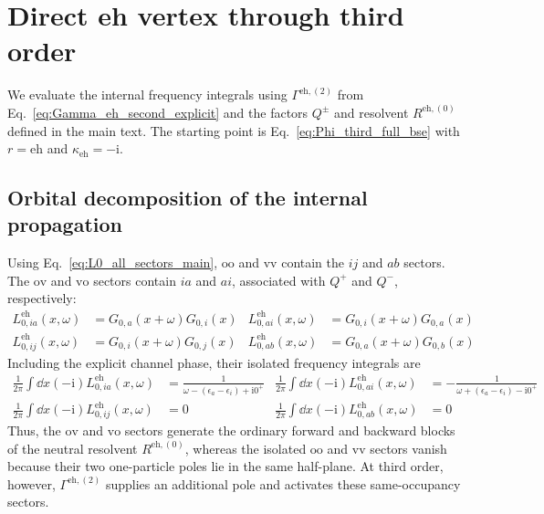 \documentclass[aip,jcp,reprint,noshowkeys,superscriptaddress]{revtex4-1}
\newcommand{\eps}{\epsilon}
\newcommand{\ii}{\mathrm{i}}
\newcommand{\eh}{\text{eh}}
\begin{document}
\onecolumngrid
\appendix

\section{Direct eh vertex through third order}
\label{sec:eh_third}

We evaluate the internal frequency integrals using
$\Gamma^{\eh,(2)}$ from Eq.~\eqref{eq:Gamma_eh_second_explicit} and
the factors $Q^\pm$ and resolvent $R^{\eh,(0)}$ defined in the main text.
The starting point is Eq.~\eqref{eq:Phi_third_full_bse} with
$r=\eh$ and $\kappa_\eh=-\ii$.

\subsection{Orbital decomposition of the internal propagation}

Using Eq.~\eqref{eq:L0_all_sectors_main}, $\text{oo}$ and $\text{vv}$
contain the $ij$ and $ab$ sectors. The $\text{ov}$ and $\text{vo}$
sectors contain $ia$ and $ai$, associated with $Q^+$ and $Q^-$, respectively:
\begin{align}
    L_{0,ia}^{\eh}(x,\omega)
    &=
    G_{0,a}(x+\omega)G_{0,i}(x)
    &
    L_{0,ai}^{\eh}(x,\omega)
    &=
    G_{0,i}(x+\omega)G_{0,a}(x)
    \\
    L_{0,ij}^{\eh}(x,\omega)
    &=
    G_{0,i}(x+\omega)G_{0,j}(x)
    &
    L_{0,ab}^{\eh}(x,\omega)
    &=
    G_{0,a}(x+\omega)G_{0,b}(x)
    \label{eq:L0_eh_sectors}
\end{align}
Including the explicit channel phase, their isolated frequency integrals are
\begin{align}
    \frac{1}{2\pi}\int\dd{x}
    (-\ii) L_{0,ia}^{\eh}(x,\omega)
    &=
    \frac{1}{\omega-(\eps_a-\eps_i)+\ii0^+}
    &
    \frac{1}{2\pi}\int\dd{x}
    (-\ii) L_{0,ai}^{\eh}(x,\omega)
    &=
    -\frac{1}{\omega+(\eps_a-\eps_i)-\ii0^+}
    \label{eq:eh_ov_vo_integral}
    \\
    \frac{1}{2\pi}\int\dd{x}
    (-\ii) L_{0,ij}^{\eh}(x,\omega)
    &=0
    &
    \frac{1}{2\pi}\int\dd{x}
    (-\ii) L_{0,ab}^{\eh}(x,\omega)
    &=0
    \label{eq:same_occupancy_bubbles_zero}
\end{align}
Thus, the $\text{ov}$ and $\text{vo}$ sectors generate the ordinary forward and
backward blocks of the neutral resolvent $R^{\eh,(0)}$, whereas the isolated
$\text{oo}$ and $\text{vv}$ sectors vanish because their two one-particle poles lie in
the same half-plane.  At third order, however, $\Gamma^{\eh,(2)}$ supplies an
additional pole and activates these same-occupancy sectors.
\end{document}
